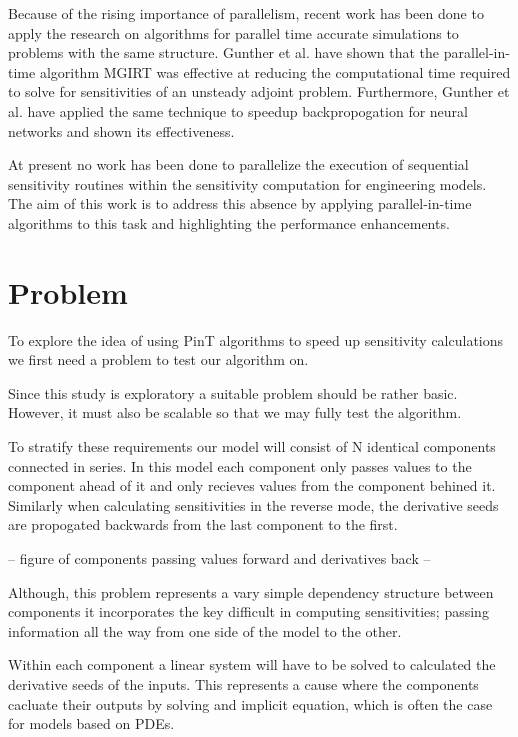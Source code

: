 \documentclass[conf]{new-aiaa}
\begin{document}
Because of the rising importance of parallelism, recent work has been done to apply the research on algorithms for parallel time accurate simulations to problems with the same structure.
Gunther et al.\cite{Gunther2019} have shown that the parallel-in-time algorithm MGIRT\cite{Falgout2014} was effective at reducing the computational time required to solve for sensitivities of an unsteady adjoint problem.
Furthermore, Gunther et al.\cite{Gunther2020} have applied the same technique to speedup backpropogation for neural networks and shown its effectiveness.


At present no work has been done to parallelize the execution of sequential sensitivity routines within the sensitivity computation for engineering models.
The aim of this work is to address this absence by applying parallel-in-time algorithms to this task and highlighting the performance enhancements.


\section{Problem}
To explore the idea of using PinT algorithms to speed up sensitivity calculations we first need a problem to test our algorithm on.

Since this study is exploratory a suitable problem should be rather basic.
However, it must also be scalable so that we may fully test the algorithm.

To stratify these requirements our model will consist of N identical components connected in series.
In this model each component only passes values to the component ahead of it and only recieves values from the component behined it.
Similarly when calculating sensitivities in the reverse mode, the derivative seeds are propogated backwards from the last component to the first.

-- figure of components passing values forward and derivatives back --


Although, this problem represents a vary simple dependency structure between components it incorporates the key difficult in computing sensitivities; passing information all the way from one side of the model to the other.


Within each component a linear system will have to be solved to calculated the derivative seeds of the inputs.
This represents a cause where the components cacluate their outputs by solving and implicit equation, which is often the case for models based on PDEs.
\end{document}
